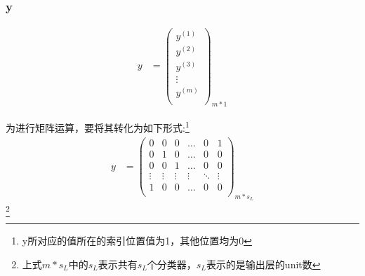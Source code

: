 \subsubsection{y}
\begin{equation} \begin{aligned}
	y & = \left(\begin{matrix}
			y^{(1)} \\ y^{(2)} \\ y^{(3)} \\ \vdots \\ y^{(m)} \\
		\end{matrix}\right)_{m*1}
\end{aligned} \end{equation}

为进行矩阵运算，要将其转化为如下形式:\footnote{y所对应的值所在的索引位置值为1，其他位置均为0}
\begin{equation}\begin{aligned}
	y &= \left(\begin{matrix}
	        0 & 0 & 0 & \dots & 0 & 1 \\
	        0 & 1 & 0 & \dots & 0 & 0 \\
	        0 & 0 & 1 & \dots & 0 & 0 \\
	        \vdots & \vdots & \vdots & \vdots & \ddots & \vdots \\
	        1 & 0 & 0 & \dots & 0 & 0 \\
		\end{matrix}\right)_{m*s_L}
\end{aligned}\end{equation}\footnote{上式$m*s_L$中的$s_L$表示共有$s_L$个分类器，$s_L$表示的是输出层的unit数}
